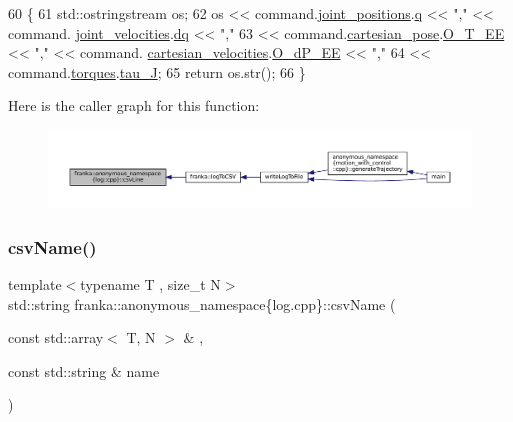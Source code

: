 \begin{DoxyCode}
60                                                      \{
61   std::ostringstream os;
62   os << command.\hyperlink{structfranka_1_1RobotCommand_a086afcec596eae5284b6c39dc1452280}{joint\_positions}.\hyperlink{classfranka_1_1JointPositions_a40e9098abe1c51cd48e17e41fbf78337}{q} << \textcolor{stringliteral}{","} << command.
      \hyperlink{structfranka_1_1RobotCommand_a049657cf2bbbb53d6ffa5581721e7b71}{joint\_velocities}.\hyperlink{classfranka_1_1JointVelocities_a14fddb6fe7a7c4034dc82c283de8c2d3}{dq} << \textcolor{stringliteral}{","}
63      << command.\hyperlink{structfranka_1_1RobotCommand_acce2090d696ebb9759fd0f37fd35a298}{cartesian\_pose}.\hyperlink{classfranka_1_1CartesianPose_a406e53e3d8fe594a11888f516eb4bf7d}{O\_T\_EE} << \textcolor{stringliteral}{","} << command.
      \hyperlink{structfranka_1_1RobotCommand_a04b4841130fab920936190be1bc5dba3}{cartesian\_velocities}.\hyperlink{classfranka_1_1CartesianVelocities_ab7a42c7c1ee7109025aff5c43a56b398}{O\_dP\_EE} << \textcolor{stringliteral}{","}
64      << command.\hyperlink{structfranka_1_1RobotCommand_a8b23e8b669b1fd594988ecdbf54bfbce}{torques}.\hyperlink{classfranka_1_1Torques_ac2a266cc2d3b7e0fb4f8eff045dbaed8}{tau\_J};
65   \textcolor{keywordflow}{return} os.str();
66 \}
\end{DoxyCode}
Here is the caller graph for this function\+:
\nopagebreak
\begin{figure}[H]
\begin{center}
\leavevmode
\includegraphics[width=350pt]{namespacefranka_1_1anonymous__namespace_02log_8cpp_03_afc6faaf6d9388a97c26970a3f0fbf976_icgraph}
\end{center}
\end{figure}
\mbox{\label{namespacefranka_1_1anonymous__namespace_02log_8cpp_03_afa84e09d4799d45ad094a8e4c2ad4c72}} 
\subsubsection{\texorpdfstring{csv\+Name()}{csvName()}}
{\footnotesize\ttfamily template$<$typename T , size\+\_\+t N$>$ \\
std\+::string franka\+::anonymous\+\_\+namespace\{log.\+cpp\}\+::csv\+Name (\begin{DoxyParamCaption}\item[{const std\+::array$<$ T, N $>$ \&}]{,  }\item[{const std\+::string \&}]{name }\end{DoxyParamCaption})}



